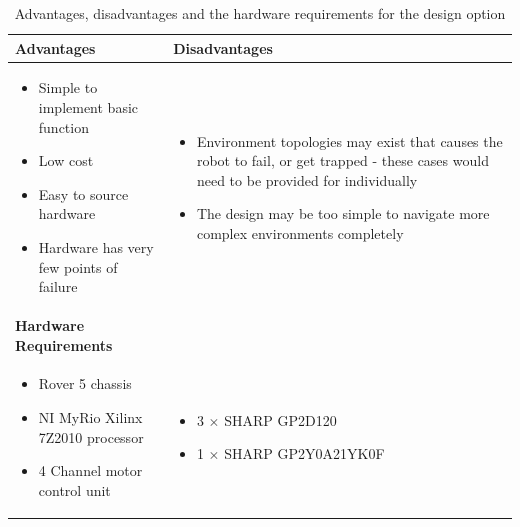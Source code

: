 \documentclass[a4paper]{article}
\begin{document}
\vspace{1cm}

\begin{table}[h]
\centering
\caption{Advantages, disadvantages and the hardware requirements for the design option}
\small\begin{tabular}{p{8cm}p{8cm}}
\toprule
\textbf{Advantages} & \textbf{Disadvantages}\\
\midrule
\begin{itemize}\item Simple to implement basic function \item Low cost \item Easy to source hardware \item Hardware has very few points of failure\end{itemize}
&
\begin{itemize}\item Environment topologies may exist that causes the robot to fail, or get trapped - these cases would need to be provided for individually \item The design may be too simple to navigate more complex environments completely\end{itemize}\\
\midrule
\textbf{Hardware Requirements} & \\
\midrule
\begin{itemize}\item Rover 5 chassis \item NI MyRio Xilinx 7Z2010 processor \item 4 Channel motor control unit \end{itemize} & \begin{itemize} \item 3 $\times$ SHARP GP2D120 \item 1 $\times$ SHARP GP2Y0A21YK0F\end{itemize}\\
\bottomrule
\end{tabular}
\end{table}
\end{document}
